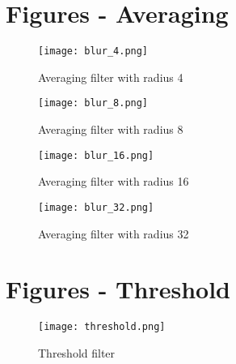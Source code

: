 \documentclass[a4paper, 12pt]{article}
\begin{document}
\newpage
\appendix
\section{Figures - Averaging}
\label{sec:fig_aver}

\begin{figure}[hb]
        \centering
        \texttt{[image: blur\_4.png]}
        \caption{Averaging filter with radius 4}
        \label{fig:blur_4}
\end{figure}
\begin{figure}[hb]
        \centering
        \texttt{[image: blur\_8.png]}
        \caption{Averaging filter with radius 8}
        \label{fig:blur_8}
\end{figure}
\begin{figure}[hb]
        \centering
        \texttt{[image: blur\_16.png]}
        \caption{Averaging filter with radius 16}
        \label{fig:blur_16}
\end{figure}
\begin{figure}[hb]
        \centering
        \texttt{[image: blur\_32.png]}
        \caption{Averaging filter with radius 32}
        \label{fig:blur_32}
\end{figure}
\clearpage

\section{Figures - Threshold}
\label{sec:fig_thres}

\begin{figure}[h]
        \centering
        \texttt{[image: threshold.png]}
        \caption{Threshold filter}
        \label{fig:thres}
\end{figure}
\end{document}
